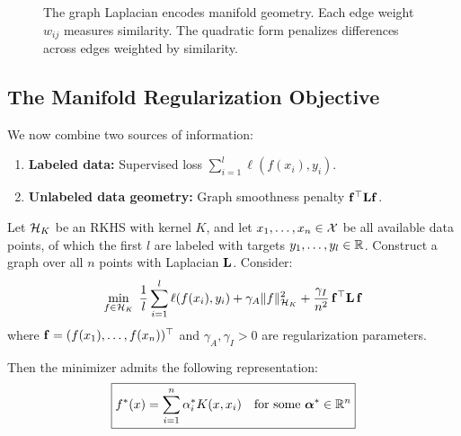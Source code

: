\begin{notechapter}
\begin{figure}[ht]
\caption{The graph Laplacian encodes manifold geometry. Each edge 
weight $w_{ij}$ measures similarity. The quadratic form penalizes 
differences across edges weighted by similarity.}
\label{rkhs:fig:graph_laplacian}
\end{figure}

\subsection{The Manifold Regularization Objective}
\label{rkhs:subsec:manifold_objective}

We now combine two sources of information:

\begin{enumerate}[label=\textbf{(\roman*)}]
  \item \textbf{Labeled data:} Supervised loss $\sum_{i=1}^l \ell(f(x_i), y_i)$.
  \item \textbf{Unlabeled data geometry:} Graph smoothness penalty 
    $\mathbf{f}^\top \mathbf{L} \mathbf{f}$.
\end{enumerate}

\begin{theorembox}
\begin{theorem}
\label{rkhs:thm:manifold_reg}
Let $\mathcal{H}_K$ be an RKHS with kernel $K$, and let $x_1,\ldots,x_n \in \mathcal{X}$ 
be all available data points, of which the first $l$ are labeled with 
targets $y_1,\ldots,y_l \in \mathbb{R}$. Construct a graph over all $n$ points 
with Laplacian $\mathbf{L}$. Consider:
\begin{equation}
\label{rkhs:eq:manifold_reg}
\min_{f \in \mathcal{H}_K}\; \frac{1}{l}\sum_{i=1}^{l} \ell(f(x_i), y_i) 
+ \gamma_A \| f \|_{\mathcal{H}_K}^2 
+ \frac{\gamma_I}{n^2}\,\mathbf{f}^\top \mathbf{L}\, \mathbf{f}
\end{equation}
where $\mathbf{f} = (f(x_1), \ldots, f(x_n))^\top$ and 
$\gamma_A, \gamma_I > 0$ are regularization parameters.

Then the minimizer admits the following representation:
\begin{equation}
\label{rkhs:eq:manifold_solution}
\boxed{f^*(x) = \sum_{i=1}^n \alpha_i^* K(x, x_i) 
\quad \text{for some } \boldsymbol{\alpha}^* \in \mathbb{R}^n}
\end{equation}
\end{theorem}
\end{theorembox}


\end{notechapter}
